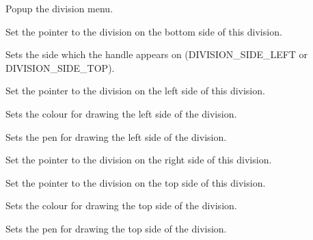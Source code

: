 Popup the division menu.



Set the pointer to the division on the bottom side of this division.



Sets the side which the handle appears on (DIVISION\_SIDE\_LEFT or DIVISION\_SIDE\_TOP).



Set the pointer to the division on the left side of this division.



Sets the colour for drawing the left side of the division.



Sets the pen for drawing the left side of the division.



Set the pointer to the division on the right side of this division.



Set the pointer to the division on the top side of this division.



Sets the colour for drawing the top side of the division.



Sets the pen for drawing the top side of the division.



